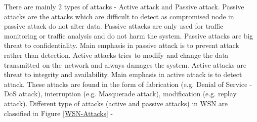 There are mainly 2 types of attacks \cite{wahid2015survey}- Active attack and Passive attack. Passive attacks are the attacks which are difficult to detect as compromised node in passive attack do not alter data. Passive attacks are only used for traffic monitoring or traffic analysis and do not harm the system. Passive attacks are big threat to confidentiality. Main emphasis in passive attack is to prevent attack rather than detection. Active attacks tries\textcolor{white}{e}to modify\textcolor{white}{e}and change the data transmitted\textcolor{white}{e}on the\textcolor{white}{e}network and always damages the system. Active attacks are threat to integrity and availability. Main emphasis in active attack is to detect attack. These attacks are found in the form of fabrication (e.g. Denial of Service -DoS attack), interruption (e.g. Masquerade attack), modification (e.g. replay attack).  Different type of attacks (active and passive attacks) in WSN are classified in Figure \ref{WSN-Attacks} \cite{nayak2015impact, abirami2013sybil, singh2014survey} -
